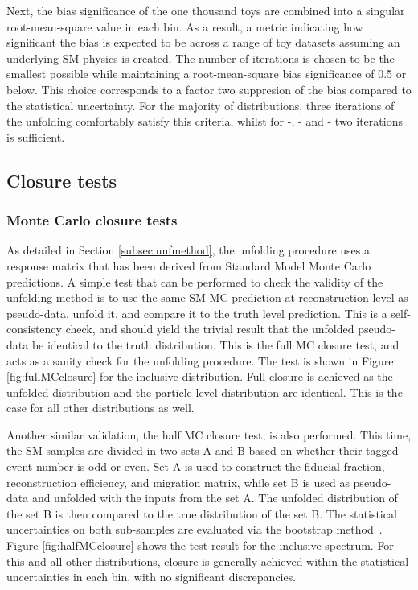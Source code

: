 Next, the bias significance of the one thousand toys are combined into a singular root-mean-square value in each bin. As a result, a metric indicating how significant the bias is expected to be across a range of toy datasets assuming an underlying SM physics is created. The number of iterations is chosen to be the smallest possible while maintaining a root-mean-square bias significance of 0.5 or below. This choice corresponds to a factor two suppresion of the bias compared to the statistical uncertainty. For the majority of distributions, three iterations of the unfolding comfortably satisfy this criteria, whilst for \mZOne-\mFourL, \dPhill-\mFourL{} and \dYPairs-\mFourL{} two iterations is sufficient. 
\subsection{Closure tests}
\label{ssec:closuretests}
\subsubsection{Monte Carlo closure tests}

As detailed in Section \ref{subsec:unfmethod}, the unfolding procedure uses a response matrix that has been derived from Standard Model Monte Carlo predictions. A simple test that can be performed to check the validity of the unfolding method is to use the same SM MC prediction at reconstruction level as pseudo-data, unfold it, and compare it to the truth level prediction. This is a self-consistency check, and should yield the trivial result that the unfolded pseudo-data be identical to the truth distribution. This is the full MC closure test, and acts as a sanity check for the unfolding procedure. The test is shown in Figure \ref{fig:fullMCclosure} for the inclusive \mFourL{} distribution. Full closure is achieved as the unfolded distribution and the particle-level distribution are identical. This is the case for all other distributions as well.

Another similar validation, the half MC closure test, is also performed. This time, the SM samples are divided in two sets A and B based on whether their tagged event number is odd or even. Set A is used to construct the fiducial fraction, reconstruction efficiency, and migration matrix, while set B is used as pseudo-data and unfolded with the inputs from the set A. The unfolded distribution of the set B is then compared to the true distribution of the set B. The statistical uncertainties on both sub-samples are evaluated via the bootstrap method~\cite{ATLAS_Bootsrap_2021}. Figure \ref{fig:halfMCclosure} shows the test result for the inclusive \mFourL{} spectrum. For this and all other distributions, closure is generally achieved within the statistical uncertainties in each bin, with no significant discrepancies. 

